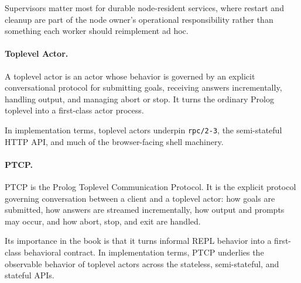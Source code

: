 Supervisors matter most for durable node-resident services, where restart and
cleanup are part of the node owner's operational responsibility rather than
something each worker should reimplement ad hoc.

\paragraph{Toplevel Actor.}
A toplevel actor is an actor whose behavior is governed by an explicit
conversational protocol for submitting goals, receiving answers incrementally,
handling output, and managing abort or stop. It turns the ordinary Prolog
toplevel into a first-class actor process.

In implementation terms, toplevel actors underpin \texttt{rpc/2-3}, the
semi-stateful HTTP API, and much of the browser-facing shell machinery.

\paragraph{PTCP.}
PTCP is the Prolog Toplevel Communication Protocol. It is the explicit protocol
governing conversation between a client and a toplevel actor: how goals are
submitted, how answers are streamed incrementally, how output and prompts may
occur, and how abort, stop, and exit are handled.

Its importance in the book is that it turns informal REPL behavior into a
first-class behavioral contract. In implementation terms, PTCP underlies the
observable behavior of toplevel actors across the stateless, semi-stateful, and
stateful APIs.

